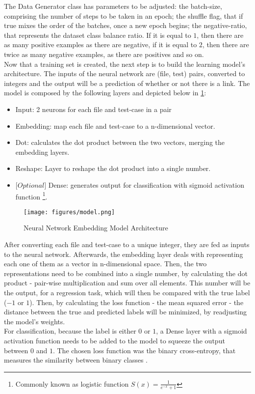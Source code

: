 The Data Generator class has parameters to be adjusted: the batch-size, comprising the number of steps to be taken in an epoch; the shuffle flag, that if true mixes the order of the batches, once a new epoch begins; the negative-ratio, that represents the dataset class balance ratio. If it is equal to $1$, then there are as many positive examples as there are negative, if it is equal to $2$, then there are twice as many negative examples, as there are positives and so on. \
\\

Now that a training set is created, the next step is to build the learning model's architecture. The inputs of the neural network are (file, test) pairs, converted to integers and the output will be a prediction of whether or not there is a link. The model is composed by the following layers and depicted below in \ref{keras_model}: 

\begin{itemize}
	\item Input: 2 neurons for each file and test-case in a pair
	\item Embedding: map each file and test-case to a n-dimensional vector.
	\item Dot: calculates the dot product between the two vectors, merging the embedding layers.
	\item Reshape: Layer to reshape the dot product into a single number.
	\item $\lbrack Optional\rbrack$ Dense: generates output for classification with sigmoid activation function \footnote{ Commonly known as logistic function $S(x) = \frac{1}{e^{-x} +1}$}.
\end{itemize}

\begin{figure}[h]
	\centering
	\texttt{[image: figures/model.png]}
	\caption{Neural Network Embedding Model Architecture}
	\label{keras_model}
\end{figure}

After converting each file and test-case to a unique integer, they are fed as inputs to the neural network. Afterwards, the embedding layer deals with representing each one of them as a vector in n-dimensional space. Then, the two representations need to be combined into a single number, by calculating the dot product - pair-wise multiplication and sum over all elements. This number will be the output, for a regression task, which will then be compared with the true label ($-1$ or $1$). Then, by calculating the loss function - the mean squared error - the distance between the true and predicted labels will be minimized, by readjusting the model's weights.
\\
For classification, because the label is either $0$ or $1$, a Dense layer with a sigmoid activation function needs to be added to the model  to squeeze the output between $0$ and $1$. The chosen loss function was the binary cross-entropy, that measures the similarity between binary classes \cite{chollet2015keras}. 
\\

